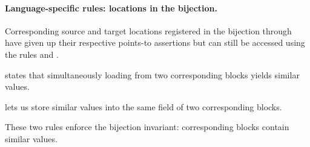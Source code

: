 \paragraph{Language-specific rules: locations in the bijection.}
Corresponding source and target locations registered in the bijection through  have given up their respective points-to assertions but can still be accessed using the rules  and .

 states that simultaneously loading from two corresponding blocks yields similar values.

 lets us store similar values into the same field of two corresponding blocks.

These two rules enforce the bijection invariant: corresponding blocks contain similar values.

